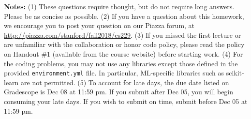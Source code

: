 {\bf Notes:} (1) These questions require thought, but do not require long
answers. Please be as concise as possible. (2) If you have a question
about this homework, we encourage you to post your question on our
Piazza forum, at \url{http://piazza.com/stanford/fall2018/cs229}. (3) If you
missed the first lecture or are unfamiliar with the collaboration or honor
code policy, please read the policy on Handout \#1 (available from the
course website) before starting work. (4) For the coding problems, you may not
use any libraries except those defined in the provided \texttt{environment.yml}
file. In particular, ML-specific libraries such as scikit-learn are not
permitted. (5) To account for late days, the due date listed on Gradescope is
Dec 08 at 11:59 pm. If you submit after Dec 05, you will begin consuming your
late days. If you wish to submit on time, submit before Dec 05 at 11:59 pm.
